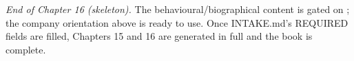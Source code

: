 \begin{partnote}
\emph{End of Chapter 16 (skeleton).} The behavioural/biographical content is
gated on ; the company orientation above is ready to use.
Once INTAKE.md's REQUIRED fields are filled, Chapters 15 and 16 are generated in
full and the book is complete.
\end{partnote}
